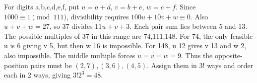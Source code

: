 For digits a,b,c,d,e,f, put $u=a+d$, $v=b+e$, $w=c+f$. Since $1000\equiv 1\pmod{111}$, divisibility requires $100 u+10 v+w\equiv 0$. Also $u+v+w=27$, so $37$ divides $11 u+v+3$. Each pair sum lies between 5 and 13. The possible multiples of 37 in this range are 74,111,148. For 74, the only feasible u is 6 giving v 5, but then w 16 is impossible. For 148, u 12 gives v 13 and w 2, also impossible. The middle multiple forces $u=v=w=9$. Thus the opposite-position pairs must be $(2,7),(3,6),(4,5)$. Assign them in $3!$ ways and order each in 2 ways, giving $3!2^3=\boxed{48}$.

